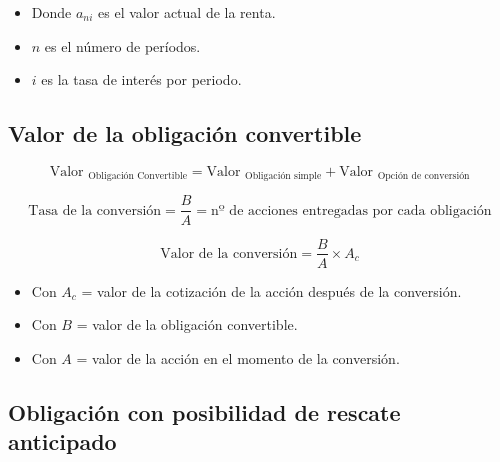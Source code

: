 \documentclass[11pt, a4paper]{article}
\begin{document}
\begin{itemize}
    \item Donde $a_{ni}$ es el valor actual de la renta.
    \item $n$ es el número de períodos.
    \item $i$ es la tasa de interés por periodo.
\end{itemize}

\subsection{Valor de la obligación convertible}

\begin{tcolorbox}[colframe=blue!50, colback=blue!5, sharp corners] %
    \begin{equation}
        \text{Valor }_{\text{Obligación Convertible}} = \text{Valor }_{\text{Obligación simple}} + \text{Valor }_{\text{Opción de conversión}}
    \end{equation}
\end{tcolorbox}

\begin{tcolorbox}[colframe=blue!50, colback=blue!5, sharp corners] %
    \begin{equation}
        \text{Tasa de la conversión} = \frac{B}{A} = \text{nº de acciones entregadas por cada obligación}
    \end{equation}
\end{tcolorbox}

\begin{tcolorbox}[colframe=blue!50, colback=blue!5, sharp corners] %
    \begin{equation}
        \text{Valor de la conversión} = \frac{B}{A} \times A_c
    \end{equation}
\end{tcolorbox}

\begin{itemize}
    \item Con $A_c$ = valor de la cotización de la acción después de la conversión.
    \item Con $B$ = valor de la obligación convertible.
    \item Con $A$ = valor de la acción en el momento de la conversión.
\end{itemize}

\subsection{Obligación con posibilidad de rescate anticipado}
\end{document}
